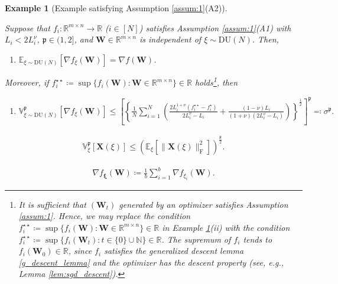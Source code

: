 \documentclass[10pt,a4paper]{amsart}
\newtheorem{expl}{Example}
\begin{document}
\begin{expl}
[Example satisfying Assumption \ref{assum:1}(A2)]\label{exp:1} {\em Suppose that $f_i \colon \mathbb{R}^{m \times n} \to \mathbb{R}$ ($i\in [N]$) satisfies Assumption \ref{assum:1}(A1) with $L_i < 2 L_i^\nu$, $\mathfrak{p} \in (1,2]$, and $\bm{W} \in \mathbb{R}^{m \times n}$ is independent of $\xi \sim \mathrm{DU}(N)$. Then, 
\begin{enumerate}
\item[(i)]
$\displaystyle{
\mathbb{E}_{\xi \sim \mathrm{DU}(N)}[\nabla f_\xi (\bm{W})] = \nabla f (\bm{W})
}$.
\end{enumerate}
Moreover, if $f_i^{\star\star} \coloneqq \sup \{ f_i(\bm{W}) \colon \bm{W} \in \mathbb{R}^{m \times n} \} \in \mathbb{R}$ holds\footnote{It is sufficient that $(\bm{W}_t)$ generated by an optimizer satisfies Assumption \ref{assum:1}. Hence, we may replace the condition $f_i^{\star\star} \coloneqq \sup \{ f_i(\bm{W}) \colon \bm{W} \in \mathbb{R}^{m \times n} \} \in \mathbb{R}$ in Example \ref{exp:1}(ii) with the condition $f_i^{\star\star} \coloneqq \sup \{ f_i(\bm{W}_t) \colon t \in \{0\} \cup \mathbb{N} \} \in \mathbb{R}$. The supremum of $f_i$ tends to $f_i (\bm{W}_0) \in \mathbb{R}$, since $f_i$ satisfies the generalized descent lemma \eqref{g_descent_lemma} and the optimizer has the descent property (see, e.g., Lemma \ref{lem:sgd_descent}).}, then
\begin{enumerate}
\item[(ii)]
$\displaystyle{
\mathbb{V}_{\xi \sim \mathrm{DU}(N)}^{\mathfrak{p}}[\nabla f_\xi (\bm{W})]
\leq \left[ 
\left\{ \frac{1}{N} \sum_{i=1}^N
\left( \frac{2 L_i^{1 + \nu}(f_i^{\star\star} - f_i^{\star})}{2 L_i^\nu - L_i}
+ 
\frac{(1 - \nu) L_i}{(1 + \nu)(2 L_i^\nu - L_i)} 
\right) 
\right\}^{\frac{1}{2}}\right]^{\mathfrak{p}}
\eqqcolon \sigma^{\mathfrak{p}}
}.$
\end{enumerate}
}  
\end{expl}

\begin{align}\label{p_variance_exp}
\mathbb{V}_{\xi}^{\mathfrak{p}}[\bm{X}(\xi)]
\leq \left( \mathbb{E}_{\xi}[\| \bm{X}(\xi)\|_{\mathrm{F}}^2] \right)^{\frac{\mathfrak{p}}{2}}.
\end{align} 

\begin{align}\label{mini_batch}
\nabla f_{\bm{\xi}}(\bm{W}) \coloneqq 
\frac{1}{b} \sum_{i=1}^b \nabla f_{\xi_{i}}(\bm{W}).
\end{align} 
\end{document}

